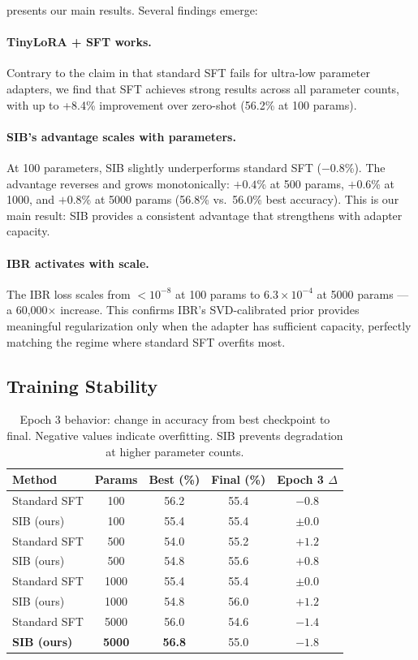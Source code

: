 \documentclass{article}
\begin{document}
 presents our main results. Several findings emerge:

\paragraph{TinyLoRA + SFT works.} Contrary to the claim in \citet{morris2026tinylora} that standard SFT fails for ultra-low parameter adapters, we find that SFT achieves strong results across all parameter counts, with up to +8.4\% improvement over zero-shot (56.2\% at 100 params).

\paragraph{SIB's advantage scales with parameters.} At 100 parameters, SIB slightly underperforms standard SFT ($-0.8$\%). The advantage reverses and grows monotonically: $+0.4$\% at 500 params, $+0.6$\% at 1000, and $\mathbf{+0.8\%}$ at 5000 params (56.8\% vs.~56.0\% best accuracy). This is our main result: SIB provides a consistent advantage that strengthens with adapter capacity.

\paragraph{IBR activates with scale.} The IBR loss scales from $<10^{-8}$ at 100 params to $6.3 \times 10^{-4}$ at 5000 params — a 60,000$\times$ increase. This confirms IBR's SVD-calibrated prior provides meaningful regularization only when the adapter has sufficient capacity, perfectly matching the regime where standard SFT overfits most.

\subsection{Training Stability}

\begin{table}[t]
\centering
\caption{Epoch 3 behavior: change in accuracy from best checkpoint to final. Negative values indicate overfitting. SIB prevents degradation at higher parameter counts.}
\label{tab:stability}
\begin{tabular}{lcccc}
\toprule
\textbf{Method} & \textbf{Params} & \textbf{Best (\%)} & \textbf{Final (\%)} & \textbf{Epoch 3 $\Delta$} \\
\midrule
Standard SFT & 100 & 56.2 & 55.4 & $-0.8$ \\
SIB (ours) & 100 & 55.4 & 55.4 & $\pm 0.0$ \\
\midrule
Standard SFT & 500 & 54.0 & 55.2 & $+1.2$ \\
SIB (ours) & 500 & 54.8 & 55.6 & $+0.8$ \\
\midrule
Standard SFT & 1000 & 55.4 & 55.4 & $\pm 0.0$ \\
SIB (ours) & 1000 & 54.8 & 56.0 & $+1.2$ \\
\midrule
Standard SFT & 5000 & 56.0 & 54.6 & $\mathbf{-1.4}$ \\
\textbf{SIB (ours)} & \textbf{5000} & \textbf{56.8} & 55.0 & $-1.8$ \\
\bottomrule
\end{tabular}
\end{table}
\end{document}
